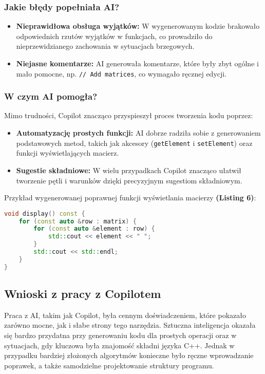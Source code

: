 \subsubsection{Jakie błędy popełniała AI?}

\begin{itemize}
  \item \textbf{Nieprawidłowa obsługa wyjątków:} W wygenerowanym kodzie brakowało odpowiednich rzutów wyjątków w funkcjach, co prowadziło do nieprzewidzianego zachowania w sytuacjach brzegowych.
  \item \textbf{Niejasne komentarze:} AI generowała komentarze, które były zbyt ogólne i mało pomocne, np. \texttt{// Add matrices}, co wymagało ręcznej edycji.
\end{itemize}

\subsubsection{W czym AI pomogła?}

Mimo trudności, Copilot znacząco przyspieszył proces tworzenia kodu poprzez:
\begin{itemize}
  \item \textbf{Automatyzację prostych funkcji:} AI dobrze radziła sobie z generowaniem podstawowych metod, takich jak akcesory (\texttt{getElement} i \texttt{setElement}) oraz funkcji wyświetlających macierz.
  \item \textbf{Sugestie składniowe:} W wielu przypadkach Copilot znacząco ułatwił tworzenie pętli i warunków dzięki precyzyjnym sugestiom składniowym.
\end{itemize}

Przykład wygenerowanej poprawnej funkcji wyświetlania macierzy \textbf{(Listing 6)}:
\begin{lstlisting}[language=C++, caption=Funkcja wyświetlająca macierz]
void display() const {
    for (const auto &row : matrix) {
        for (const auto &element : row) {
            std::cout << element << " ";
        }
        std::cout << std::endl;
    }
}
\end{lstlisting}

\subsection{Wnioski z pracy z Copilotem}

Praca z AI, takim jak Copilot, była cennym doświadczeniem, które pokazało zarówno mocne, jak i słabe strony tego narzędzia. Sztuczna inteligencja okazała się bardzo przydatna przy generowaniu kodu dla prostych operacji oraz w sytuacjach, gdy kluczowa była znajomość składni języka C++. Jednak w przypadku bardziej złożonych algorytmów konieczne było ręczne wprowadzanie poprawek, a także samodzielne projektowanie struktury programu.

